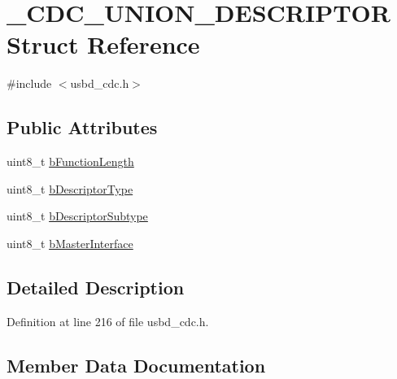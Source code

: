 \hypertarget{struct___c_d_c___u_n_i_o_n___d_e_s_c_r_i_p_t_o_r}{}\section{\+\_\+\+C\+D\+C\+\_\+\+U\+N\+I\+O\+N\+\_\+\+D\+E\+S\+C\+R\+I\+P\+T\+OR Struct Reference}
\label{struct___c_d_c___u_n_i_o_n___d_e_s_c_r_i_p_t_o_r}


{\ttfamily \#include $<$usbd\+\_\+cdc.\+h$>$}

\subsection*{Public Attributes}
\begin{DoxyCompactItemize}
\item 
uint8\+\_\+t \hyperlink{struct___c_d_c___u_n_i_o_n___d_e_s_c_r_i_p_t_o_r_a1dfd18183a0989b8631c11b718ce3819}{b\+Function\+Length}
\item 
uint8\+\_\+t \hyperlink{struct___c_d_c___u_n_i_o_n___d_e_s_c_r_i_p_t_o_r_a605016c2bd378f5dd95533edf130b4c9}{b\+Descriptor\+Type}
\item 
uint8\+\_\+t \hyperlink{struct___c_d_c___u_n_i_o_n___d_e_s_c_r_i_p_t_o_r_a5d9d4e51f6313dd40d479cbd688b8c8d}{b\+Descriptor\+Subtype}
\item 
uint8\+\_\+t \hyperlink{struct___c_d_c___u_n_i_o_n___d_e_s_c_r_i_p_t_o_r_aaa7e80367c520e1fc09a73f336df048e}{b\+Master\+Interface}
\end{DoxyCompactItemize}


\subsection{Detailed Description}


Definition at line 216 of file usbd\+\_\+cdc.\+h.



\subsection{Member Data Documentation}
\mbox{\label{struct___c_d_c___u_n_i_o_n___d_e_s_c_r_i_p_t_o_r_a5d9d4e51f6313dd40d479cbd688b8c8d}} 
